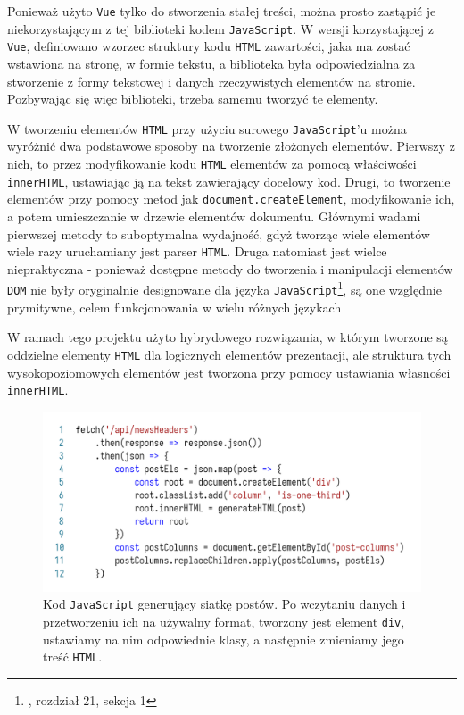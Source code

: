 \documentclass[licencjacka]{pracadypl}
\begin{document}
Ponieważ użyto \texttt{Vue} tylko do stworzenia stałej treści, można prosto zastąpić je niekorzystającym z tej biblioteki kodem \texttt{JavaScript}. W wersji korzystającej z \texttt{Vue}, definiowano wzorzec struktury kodu \texttt{HTML} zawartości, jaka ma zostać wstawiona na stronę, w formie tekstu, a biblioteka była odpowiedzialna za stworzenie z formy tekstowej i danych rzeczywistych elementów na stronie. Pozbywając się więc biblioteki, trzeba samemu tworzyć te elementy.

W tworzeniu elementów \texttt{HTML} przy użyciu surowego \texttt{JavaScript}'u można wyróżnić dwa podstawowe sposoby na tworzenie złożonych elementów. Pierwszy z nich, to przez modyfikowanie kodu \texttt{HTML} elementów za pomocą właściwości \texttt{innerHTML}, ustawiając ją na tekst zawierający docelowy kod. Drugi, to tworzenie elementów przy pomocy metod jak \texttt{document.createElement}, modyfikowanie ich, a potem umieszczanie w drzewie elementów dokumentu. Głównymi wadami pierwszej metody to suboptymalna wydajność, gdyż tworząc wiele elementów wiele razy uruchamiany jest parser \texttt{HTML}. Druga natomiast jest wielce niepraktyczna - ponieważ dostępne metody do tworzenia i manipulacji elementów \texttt{DOM} nie były oryginalnie designowane dla języka \texttt{JavaScript}\footnote{\cite{wspr}, rozdział 21, sekcja 1}, są one względnie prymitywne, celem funkcjonowania w wielu różnych językach

W ramach tego projektu użyto hybrydowego rozwiązania, w którym tworzone są oddzielne elementy \texttt{HTML} dla logicznych elementów prezentacji, ale struktura tych wysokopoziomowych elementów jest tworzona przy pomocy ustawiania własności \texttt{innerHTML}.

\begin{figure}[H]
  \centering
  \includegraphics[width=\linewidth/\real{1.2}]{images/code-js-elem-gen.png}
  \caption{Kod \texttt{JavaScript} generujący siatkę postów. Po wczytaniu danych i przetworzeniu ich na używalny format, tworzony jest element \texttt{div}, ustawiamy na nim odpowiednie klasy, a następnie zmieniamy jego treść \texttt{HTML}.}
  \label{fig:code-js-elem-gen}
\end{figure}
\end{document}
